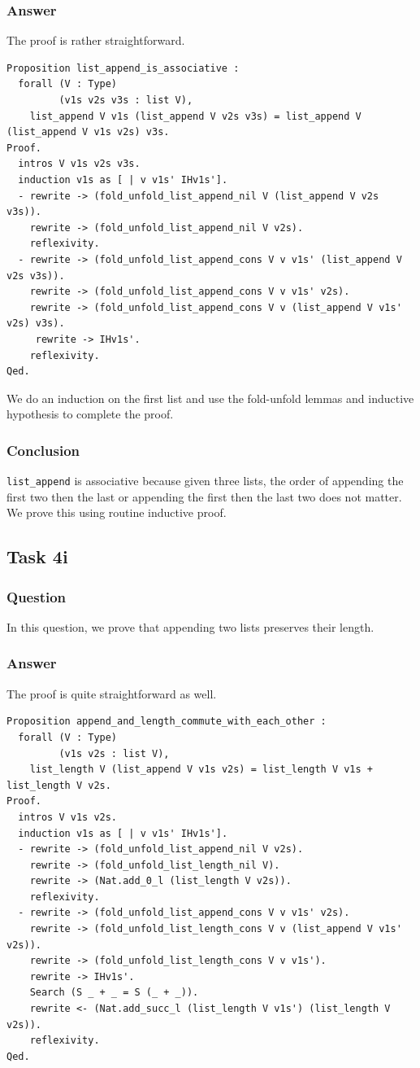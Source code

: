 \documentclass{article}
\begin{document}
\subsubsection{Answer}
The proof is rather straightforward.

\begin{lstlisting}
Proposition list_append_is_associative :
  forall (V : Type)
         (v1s v2s v3s : list V),
    list_append V v1s (list_append V v2s v3s) = list_append V (list_append V v1s v2s) v3s.
Proof.
  intros V v1s v2s v3s.
  induction v1s as [ | v v1s' IHv1s'].
  - rewrite -> (fold_unfold_list_append_nil V (list_append V v2s v3s)).
    rewrite -> (fold_unfold_list_append_nil V v2s).
    reflexivity.
  - rewrite -> (fold_unfold_list_append_cons V v v1s' (list_append V v2s v3s)).
    rewrite -> (fold_unfold_list_append_cons V v v1s' v2s).
    rewrite -> (fold_unfold_list_append_cons V v (list_append V v1s' v2s) v3s).
     rewrite -> IHv1s'.
    reflexivity.
Qed.
\end{lstlisting}

We do an induction on the first list and use the fold-unfold lemmas and inductive hypothesis to complete the proof.

\subsubsection{Conclusion}
\texttt{list\_append} is associative because given three lists, the order of appending the first two then the last or appending the first then the last two does not matter. We prove this using routine inductive proof.

\subsection{Task 4i}

\subsubsection{Question}
In this question, we prove that appending two lists preserves their length.

\subsubsection{Answer}
The proof is quite straightforward as well.

\begin{lstlisting}
Proposition append_and_length_commute_with_each_other :
  forall (V : Type)
         (v1s v2s : list V),
    list_length V (list_append V v1s v2s) = list_length V v1s + list_length V v2s.
Proof.
  intros V v1s v2s.
  induction v1s as [ | v v1s' IHv1s'].
  - rewrite -> (fold_unfold_list_append_nil V v2s).
    rewrite -> (fold_unfold_list_length_nil V).
    rewrite -> (Nat.add_0_l (list_length V v2s)).
    reflexivity.
  - rewrite -> (fold_unfold_list_append_cons V v v1s' v2s).
    rewrite -> (fold_unfold_list_length_cons V v (list_append V v1s' v2s)).
    rewrite -> (fold_unfold_list_length_cons V v v1s').
    rewrite -> IHv1s'.
    Search (S _ + _ = S (_ + _)).
    rewrite <- (Nat.add_succ_l (list_length V v1s') (list_length V v2s)).
    reflexivity.
Qed.
\end{lstlisting}
\end{document}
